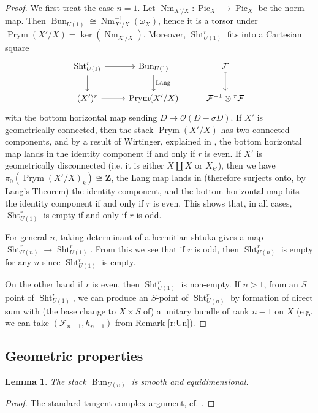 \documentclass[reqno]{amsart}
\numberwithin{equation}{section}
\newcommand{\Z}{\mathbf{Z}}
\newcommand{\ol}[1]{\overline{#1}}
\newcommand{\Cal}[1]{\mathcal{#1}}
\DeclareMathOperator{\Nm}{Nm}
\DeclareMathOperator{\Bun}{Bun}
\DeclareMathOperator{\Pic}{Pic}
\DeclareMathOperator{\Sht}{Sht}
\DeclareMathOperator{\Prym}{Prym}
\newcommand\ot{\otimes}
\renewcommand{\t}{\tau}
\newcommand{\om}{\omega}
\newcommand\cF{\mathcal{F}}
\newtheorem{lemma}[thm]{Lemma}
\theoremstyle{remark}
\numberwithin{equation}{section}
\begin{document}
\begin{proof} We first treat the case $n=1$. Let $\Nm_{X'/X}: \Pic_{X'}\to \Pic_{X}$ be the norm map. Then $\Bun_{U(1)}\cong \Nm^{-1}_{X'/X}(\om_{X})$, hence it is a torsor under $\Prym(X'/X)=\ker(\Nm_{X'/X})$. Moreover, $\Sht_{U(1)}^r$ fits into a Cartesian square
\[
\begin{tikzcd}
\Sht_{U(1)}^r \ar[r] \ar[d] & \Bun_{U(1)} \ar[d, "\text{Lang}"] & \cF\ar[d, maps to] \\
(X')^r \ar[r] & \Prym(X'/X)  & \cF^{-1}\ot {}^{\t}\cF 
\end{tikzcd}
\]
with the bottom horizontal map sending $D \mapsto  \Cal{O}(D - \sigma D )$. If $X'$ is geometrically connected, then the stack $\Prym(X'/X)$ has two connected components, and by a result of Wirtinger, explained in \cite[\S 2]{Mum71}, the bottom horizontal map lands in the identity component if and only if $r$ is even. If $X'$ is geometrically disconnected (i.e. it is either $X \coprod X$ or $X_{k'}$), then we have $\pi_0(\Prym(X'/X)_{\ol{k}}) \cong \Z$, the Lang map lands in (therefore surjects onto, by Lang's Theorem) the identity component, and the bottom horizontal map hits the identity component if and only if $r$ is even. This shows that, in all cases, $\Sht_{U(1)}^r$ is empty if and only if $r$ is odd. 

For general $n$, taking determinant of a hermitian shtuka gives a map $\Sht^{r}_{U(n)}\to \Sht^{r}_{U(1)}$. From this we see that if $r$ is odd, then $\Sht_{U(n)}^r$ is empty for any $n$ since $\Sht^{r}_{U(1)}$ is empty.

On the other hand if $r$ is even, then $\Sht_{U(1)}^r$ is non-empty. If $n>1$, from an $S$ point of $\Sht_{U(1)}^r$, we can produce an $S$-point of $\Sht_{U(n)}^r$ by formation of direct sum with (the base change to $X\times S$ of) a unitary bundle of rank $n-1$ on $X$ (e.g. we can take $(\cF_{n-1},h_{n-1})$ from Remark \ref{r:Un}). 
\end{proof}



\subsection{Geometric properties} 


\begin{lemma}\label{lem: smooth Bun_G}
The stack $\Bun_{U(n)}$ is smooth and equidimensional.  
\end{lemma}

\begin{proof}
The standard tangent complex argument, cf. \cite[Prop. 1]{Hei10}.
\end{proof}
\end{document}
